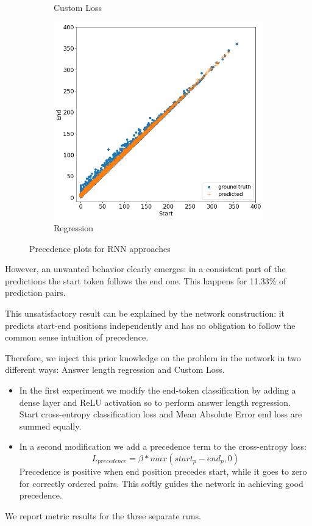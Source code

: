 \documentclass{article}
\begin{document}
\begin{figure}[!ht]
\begin{subfigure}{0.5\textwidth}
\caption{Custom Loss}
\label{fig2:sub2}
\end{subfigure}
\begin{subfigure}{\linewidth}
\centering
\includegraphics[width=.5\textwidth]{RNN_regression_precedence.png}
\caption{Regression}
\label{fig2:sub3}
\end{subfigure}
\caption{Precedence plots for RNN approaches}
\label{fig2}
\end{figure}

However, an unwanted behavior clearly emerges: in a consistent part of the predictions the start token follows the end one.
This happens for 11.33\% of prediction pairs.

This unsatisfactory result can be explained by the network construction: it predicts start-end positions independently and has no obligation to follow the common sense intuition of precedence.

Therefore, we inject this prior knowledge on the problem in the network in two different ways:  Answer length regression and Custom Loss.
\begin{itemize}
    \item In the first experiment we modify the end-token classification by adding a dense layer and ReLU activation so to perform answer length regression. Start cross-entropy classification loss and Mean Absolute Error end loss are summed equally.
    
    \item In a second modification we add a precedence term to the cross-entropy loss: \[L_{precedence} = \beta * max(start_p - end_p, 0)\]
    Precedence is positive when end position precedes start, while it goes to zero for correctly ordered pairs.
    This softly guides the network in achieving good precedence.
    
\end{itemize}

We report metric results for the three separate runs.
\end{document}
